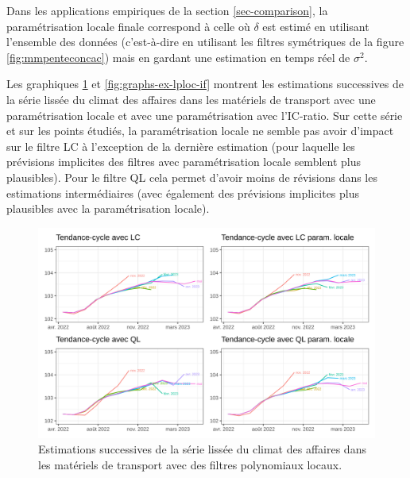 \documentclass[
  12pt,
  a4paper,french]{article}
\newcommand\1{\mathds{1}}
\begin{document}
Dans les applications empiriques de la section \ref{sec-comparison}, la paramétrisation locale finale correspond à celle où \(\delta\) est estimé en utilisant l'ensemble des données (c'est-à-dire en utilisant les filtres symétriques de la figure \ref{fig:mmpenteconcac}) mais en gardant une estimation en temps réel de \(\sigma^2\).

Les graphiques \ref{fig:graphs-ex-lploc-es} et \ref{fig:graphs-ex-lploc-if} montrent les estimations successives de la série lissée du climat des affaires dans les matériels de transport avec une paramétrisation locale et avec une paramétrisation avec l'IC-ratio.
Sur cette série et sur les points étudiés, la paramétrisation locale ne semble pas avoir d'impact sur le filtre LC à l'exception de la dernière estimation (pour laquelle les prévisions implicites des filtres avec paramétrisation locale semblent plus plausibles).
Pour le filtre QL cela permet d'avoir moins de révisions dans les estimations intermédiaires (avec également des prévisions implicites plus plausibles avec la paramétrisation locale).

\begin{figure}

{\centering \includegraphics[width=1\linewidth]{img/ex/lp_local_es} 

}

\caption[Estimations successives de la série lissée du climat des affaires dans les matériels de transport avec des filtres polynomiaux locaux]{Estimations successives de la série lissée du climat des affaires dans les matériels de transport avec des filtres polynomiaux locaux.}\label{fig:graphs-ex-lploc-es}

\footnotesize
\normalsize\end{figure}
\end{document}
